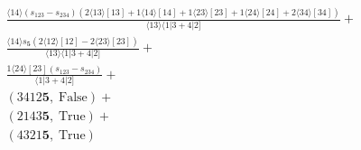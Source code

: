 \documentclass[varwidth, border=5pt]{standalone}
\begin{document}
\begin{my}
$\begin{gathered}
\scriptscriptstyle\frac{⟨14⟩(s_{123}-s_{234})(2⟨13⟩[13]+1⟨14⟩[14]+1⟨23⟩[23]+1⟨24⟩[24]+2⟨34⟩[34])}{⟨13⟩⟨1|3+4|2]} +\\
\scriptscriptstyle\frac{⟨14⟩s_{𝟓}(2⟨12⟩[12]-2⟨23⟩[23])}{⟨13⟩⟨1|3+4|2]} +\\
\scriptscriptstyle\frac{1⟨24⟩[23](s_{123}-s_{234})}{⟨1|3+4|2]} +\\
\scriptscriptstyle(3412𝟓,\;\text{False}) +\\
\scriptscriptstyle(2143𝟓,\;\text{True}) +\\
\scriptscriptstyle(4321𝟓,\;\text{True}) \phantom{+}
\end{gathered}$
\end{my}
\end{document}
